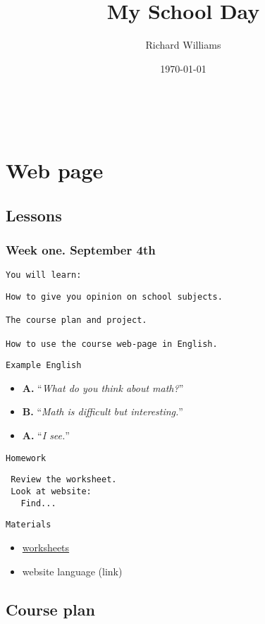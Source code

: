 \documentclass[11pt]{article}
\author{Richard Williams}
\date{\today}
\title{My School Day}
\begin{document}
\maketitle
\tableofcontents

\begin{center}
\begin{tabular}{}
\\\empty
\end{tabular}
\end{center}
\section*{Web page}
\label{sec:orgdeb4cea}
\subsection*{Lessons}
\label{sec:org18b2638}
\subsubsection*{Week one. September 4th}
\label{sec:orge41d6df}
\texttt{You will learn:}
\begin{verbatim}
How to give you opinion on school subjects.

The course plan and project.

How to use the course web-page in English.
\end{verbatim}
\texttt{Example English}

\begin{itemize}
\item \textbf{A.} ``\emph{What do you think about math?}''
\item \textbf{B.} ``\emph{Math is difficult but interesting.}''
\item \textbf{A.} ``\emph{I see.}''
\end{itemize}
\texttt{Homework}
\begin{verbatim}
 Review the worksheet.
 Look at website:
   Find...
\end{verbatim}

\texttt{Materials}
\begin{itemize}
\item \href{https://sendagirich.github.io/school\_wks.pdf}{worksheets}
\item website language (link)
\end{itemize}
\subsection*{Course plan}
\label{sec:org39092c8}
\end{document}
